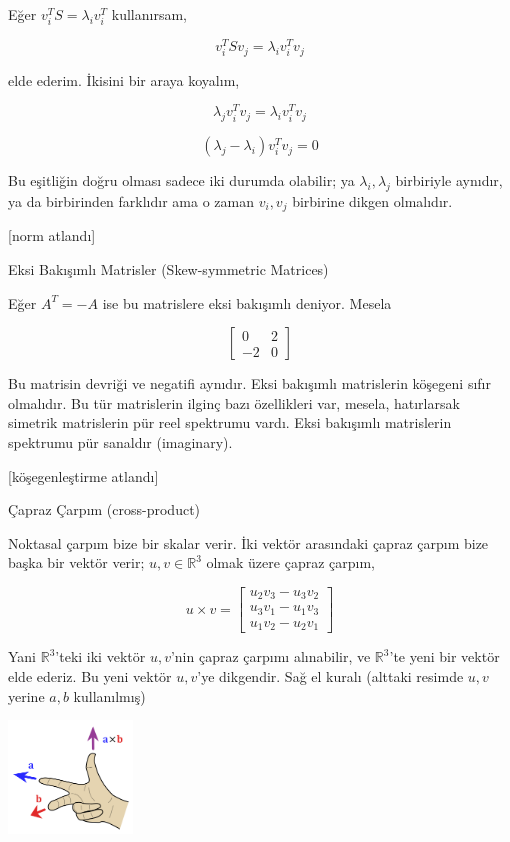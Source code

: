 \documentclass[12pt,fleqn]{article}\usepackage{../../common}
\begin{document}
Eğer  $v_i^TS = \lambda_i v_i^T$ kullanırsam,

$$ v_i^T S v_j  = \lambda_i v_i^T v_j $$

elde ederim. İkisini bir araya koyalım,

$$ \lambda_j v_i^T v_j =  \lambda_i v_i^T v_j $$

$$ (\lambda_j-\lambda_i) v_i^T v_j = 0$$

Bu eşitliğin doğru olması sadece iki durumda olabilir; ya
$\lambda_i,\lambda_j$ birbiriyle aynıdır, ya da birbirinden farklıdır ama
o zaman  $v_i,v_j$ birbirine dikgen olmalıdır. 

[norm atlandı]

Eksi Bakışımlı Matrisler (Skew-symmetric Matrices)

Eğer $A^T = -A$ ise bu matrislere eksi bakışımlı deniyor. Mesela

$$ 
\left[\begin{array}{rr}
0 & 2 \\ -2 & 0
\end{array}\right]
 $$

Bu matrisin devriği ve negatifi aynıdır. Eksi bakışımlı matrislerin
köşegeni sıfır olmalıdır. Bu tür matrislerin ilginç bazı özellikleri var,
mesela, hatırlarsak simetrik matrislerin pür reel spektrumu vardı. Eksi
bakışımlı matrislerin spektrumu pür sanaldır (imaginary).

[köşegenleştirme atlandı]

Çapraz Çarpım (cross-product) 

Noktasal çarpım bize bir skalar verir. İki vektör arasındaki çapraz çarpım
bize başka bir vektör verir; $u,v \in \mathbb{R}^3$ olmak üzere çapraz çarpım,

$$ 
u \times v = 
\left[\begin{array}{r}
u_2v_3 - u_3v_2 \\
u_3v_1 - u_1v_3 \\
u_1v_2 - u_2v_1 
\end{array}\right]
$$

Yani $\mathbb{R}^3$'teki iki vektör $u,v$'nin çapraz çarpımı alınabilir, ve
$\mathbb{R}^3$'te yeni bir vektör elde ederiz. Bu yeni vektör $u,v$'ye
dikgendir. Sağ el kuralı (alttaki resimde $u,v$ yerine $a,b$ kullanılmış)

\includegraphics[height=3cm]{righthand.png}
\end{document}
